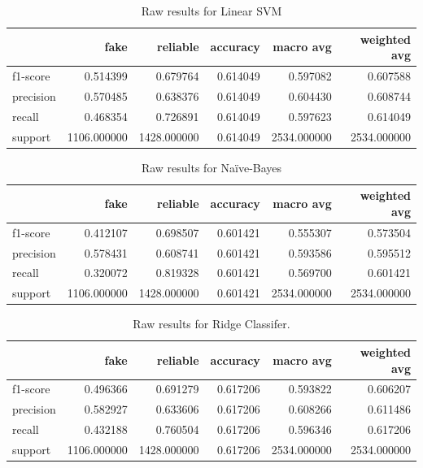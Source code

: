 \begin{table}
\begin{tabular}{lrrrrr}
\toprule
{} &         fake &     reliable &  accuracy &    macro avg &  weighted avg \\
\midrule
f1-score  &     0.514399 &     0.679764 &  0.614049 &     0.597082 &      0.607588 \\
precision &     0.570485 &     0.638376 &  0.614049 &     0.604430 &      0.608744 \\
recall    &     0.468354 &     0.726891 &  0.614049 &     0.597623 &      0.614049 \\
support   &  1106.000000 &  1428.000000 &  0.614049 &  2534.000000 &   2534.000000 \\
\bottomrule
\end{tabular}
\caption{Raw results for Linear SVM}
\end{table}

\begin{table}
\begin{tabular}{lrrrrr}
\toprule
{} &         fake &     reliable &  accuracy &    macro avg &  weighted avg \\
\midrule
f1-score  &     0.412107 &     0.698507 &  0.601421 &     0.555307 &      0.573504 \\
precision &     0.578431 &     0.608741 &  0.601421 &     0.593586 &      0.595512 \\
recall    &     0.320072 &     0.819328 &  0.601421 &     0.569700 &      0.601421 \\
support   &  1106.000000 &  1428.000000 &  0.601421 &  2534.000000 &   2534.000000 \\
\bottomrule
\end{tabular}
\caption{Raw results for Na\"{i}ve-Bayes}
\end{table}

\begin{table}
\begin{tabular}{lrrrrr}
\toprule
{} &         fake &     reliable &  accuracy &    macro avg &  weighted avg \\
\midrule
f1-score  &     0.496366 &     0.691279 &  0.617206 &     0.593822 &      0.606207 \\
precision &     0.582927 &     0.633606 &  0.617206 &     0.608266 &      0.611486 \\
recall    &     0.432188 &     0.760504 &  0.617206 &     0.596346 &      0.617206 \\
support   &  1106.000000 &  1428.000000 &  0.617206 &  2534.000000 &   2534.000000 \\
\bottomrule
\end{tabular}
\caption{Raw results for Ridge Classifer.}
\end{table}


